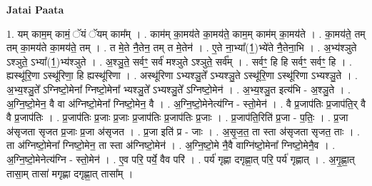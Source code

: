 \documentclass[17pt]{extarticle}
\begin{document}
\textbf{Jatai Paata} \newline

1. यम् काम॒म् कामं॒ ॅयं ॅयम् काम᳚म् । . काम॑म् का॒मय॑ते का॒मय॑ते॒ काम॒म् काम॑म् का॒मय॑ते । . का॒मय॑ते॒ तम् तम् का॒मय॑ते का॒मय॑ते॒ तम् । . त मे॒ते नै॒तेन॒ तम् त मे॒तेन॑ । . ए॒ते ना॒भ्या᳚(1॒)भ्ये॑ते नै॒तेना॒भि । . अ॒भ्य॑श्ञुते ऽश्ञुते॒ ऽभ्या᳚(1॒)भ्य॑श्ञुते । . अ॒श्ञु॒ते॒ सर्वꣳ॒॒ सर्व॑ मश्ञुते ऽश्ञुते॒ सर्व᳚म् । . सर्वꣳ॒॒ हि हि सर्वꣳ॒॒ सर्वꣳ॒॒ हि । . ह्यस्थू॑रि॒णा ऽस्थू॑रिणा॒ हि ह्यस्थू॑रिणा । . अस्थू॑रिणा ऽभ्यश्ञु॒ते᳚ ऽभ्यश्ञु॒ते ऽस्थू॑रि॒णा ऽस्थू॑रिणा ऽभ्यश्ञु॒ते । . अ॒भ्य॒श्ञु॒ते᳚ ऽग्निष्टो॒मेना᳚ ग्निष्टो॒मेना᳚ भ्यश्ञु॒ते᳚ ऽभ्यश्ञु॒ते᳚ ऽग्निष्टो॒मेन॑ । . अ॒भ्य॒श्ञु॒त इत्य॑भि - अ॒श्ञु॒ते । . अ॒ग्नि॒ष्टो॒मेन॒ वै वा अ॑ग्निष्टो॒मेना᳚ ग्निष्टो॒मेन॒ वै । . अ॒ग्नि॒ष्टो॒मेनेत्य॑ग्नि - स्तो॒मेन॑ । . वै प्र॒जाप॑तिः प्र॒जाप॑ति॒र् वै वै प्र॒जाप॑तिः । . प्र॒जाप॑तिः प्र॒जाः प्र॒जाः प्र॒जाप॑तिः प्र॒जाप॑तिः प्र॒जाः । . प्र॒जाप॑ति॒रिति॑ प्र॒जा - प॒तिः॒ । . प्र॒जा अ॑सृजता सृजत प्र॒जाः प्र॒जा अ॑सृजत । . प्र॒जा इति॑ प्र - जाः । . अ॒सृ॒ज॒त॒ ता स्ता अ॑सृजता सृजत॒ ताः । . ता अ॑ग्निष्टो॒मेना᳚ ग्निष्टो॒मेन॒ ता स्ता अ॑ग्निष्टो॒मेन॑ । . अ॒ग्नि॒ष्टो॒मे नै॒वै वाग्नि॑ष्टो॒मेना᳚ ग्निष्टो॒मेनै॒व । . अ॒ग्नि॒ष्टो॒मेनेत्य॑ग्नि - स्तो॒मेन॑ । . ए॒व परि॒ पर्ये॒ वैव परि॑ । . पर्य॑ गृह्णा दगृह्णा॒त् परि॒ पर्य॑ गृह्णात् । . अ॒गृ॒ह्णा॒त् तासा॒म् तासा॑ मगृह्णा दगृह्णा॒त् तासा᳚म् । \newline
\end{document}
